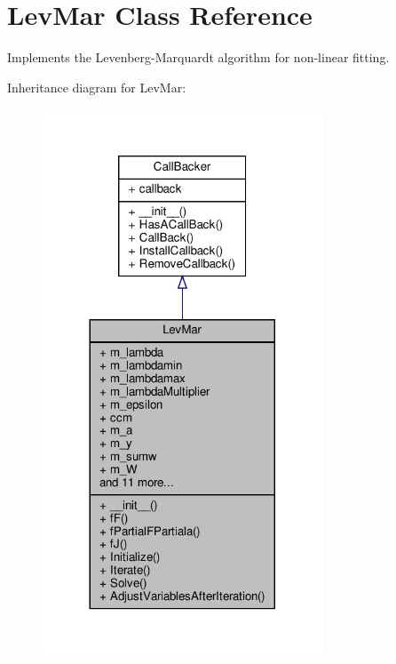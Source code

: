 \hypertarget{classSignalIntegrity_1_1Fit_1_1LevMar_1_1LevMar}{}\section{Lev\+Mar Class Reference}
\label{classSignalIntegrity_1_1Fit_1_1LevMar_1_1LevMar}


Implements the Levenberg-\/\+Marquardt algorithm for non-\/linear fitting.  




Inheritance diagram for Lev\+Mar\+:\nopagebreak
\begin{figure}[H]
\begin{center}
\leavevmode
\includegraphics[width=236pt]{classSignalIntegrity_1_1Fit_1_1LevMar_1_1LevMar__inherit__graph}
\end{center}
\end{figure}


